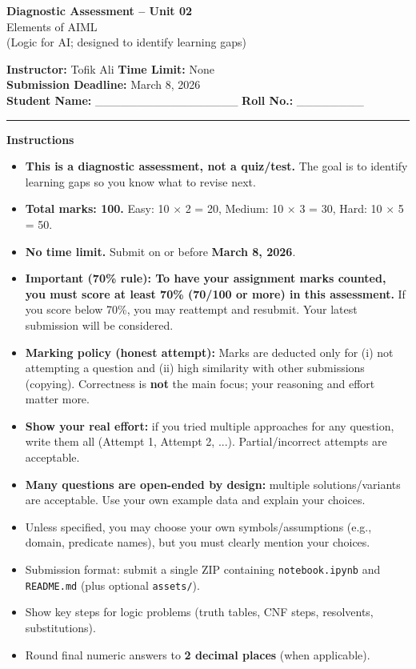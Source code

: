 \documentclass[11pt,a4paper]{article}
\newcommand{\SubmissionDeadline}{March 8, 2026}
\begin{document}
\begin{center}
  {\LARGE \textbf{Diagnostic Assessment -- Unit 02}}\\[0.25em]
  {\large Elements of AIML}\\[0.25em]
  \normalsize (Logic for AI; designed to identify learning gaps)
\end{center}

\noindent
\textbf{Instructor:} Tofik Ali \hfill \textbf{Time Limit:} None\\
\textbf{Submission Deadline:} \SubmissionDeadline\\
\textbf{Student Name:} \_\_\_\_\_\_\_\_\_\_\_\_\_\_\_\_\_ \hfill \textbf{Roll No.:} \_\_\_\_\_\_\_\_\\

\vspace{0.6em}
\hrule
\vspace{0.8em}

\textbf{Instructions}
\begin{itemize}[leftmargin=*]
  \item \textbf{This is a diagnostic assessment, not a quiz/test.} The goal is to identify learning gaps so you know what to revise next.
  \item \textbf{Total marks: 100.} Easy: 10 $\times$ 2 = 20, Medium: 10 $\times$ 3 = 30, Hard: 10 $\times$ 5 = 50.
  \item \textbf{No time limit.} Submit on or before \textbf{\SubmissionDeadline}.
  \item \textbf{Important (70\% rule): To have your assignment marks counted, you must score at least 70\% (70/100 or more) in this assessment.}
    If you score below 70\%, you may reattempt and resubmit. Your latest submission will be considered.
  \item \textbf{Marking policy (honest attempt):} Marks are deducted only for (i) not attempting a question and (ii) high similarity with other submissions (copying).
    Correctness is \textbf{not} the main focus; your reasoning and effort matter more.
  \item \textbf{Show your real effort:} if you tried multiple approaches for any question, write them all (Attempt 1, Attempt 2, ...). Partial/incorrect attempts are acceptable.
  \item \textbf{Many questions are open-ended by design:} multiple solutions/variants are acceptable. Use your own example data and explain your choices.
  \item Unless specified, you may choose your own symbols/assumptions (e.g., domain, predicate names), but you must clearly mention your choices.
  \item Submission format: submit a single ZIP containing \texttt{notebook.ipynb} and \texttt{README.md} (plus optional \texttt{assets/}).
  \item Show key steps for logic problems (truth tables, CNF steps, resolvents, substitutions).
  \item Round final numeric answers to \textbf{2 decimal places} (when applicable).
\end{itemize}
\end{document}
